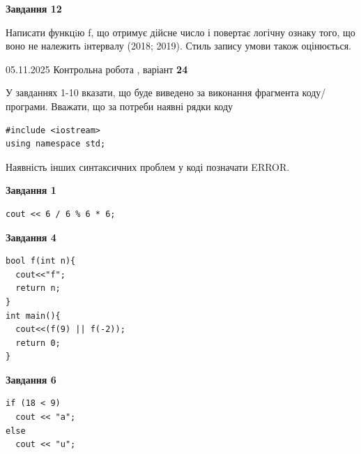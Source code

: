 \documentclass[12pt, ukrainian]{article}
\begin{document}
{\begin {large}
\begin{minipage}[t]{11.0cm}
\begin{center}
\textbf{Завдання 12}
\end{center}

Написати функцiю f, що отримує дійсне число і повертає логічну ознаку того, що воно не належить iнтервалу (2018; 2019). Стиль запису умови також оцінюється.\par

\end{minipage}

\end {large}}
\newpage

{\Large{05.11.2025 Контрольна робота , варіант  \No \textbf { 24 }\par}}
{
\begin {large}
У завданнях 1-10 вказати, що буде виведено за виконання фрагмента коду/про\-гра\-ми.
Вважати, що за потреби наявні рядки коду
\begin{verbatim}
#include <iostream>
using namespace std;
\end{verbatim}
Наявність інших синтаксичних проблем у коді позначати ERROR.

\begin{minipage}[t]{7.0cm}

\begin{center}
\textbf{Завдання 1}
\end{center}
\vspace{-8mm}

\begin{verbatim}
cout << 6 / 6 % 6 * 6;
\end{verbatim}



\begin{center}
\textbf{Завдання 4}
\end{center}
\vspace{-8mm}

\begin{verbatim}
bool f(int n){
  cout<<"f";
  return n;
}
int main(){
  cout<<(f(9) || f(-2));
  return 0;
}
\end{verbatim}



\begin{center}
\textbf{Завдання 6}
\end{center}
\vspace{-8mm}

\begin{verbatim}
if (18 < 9)
  cout << "a";
else
  cout << "u";
\end{verbatim}




\end{minipage}
\end{large}}
\end{document}

